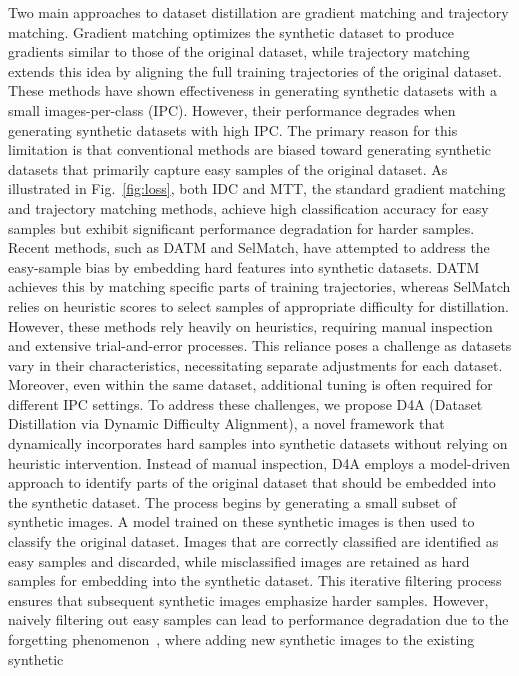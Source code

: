 \documentclass{article}
\theoremstyle{plain}
\theoremstyle{definition}
\theoremstyle{remark}
\begin{document}
Two main approaches to dataset distillation are gradient matching and trajectory matching. Gradient
matching optimizes the synthetic dataset to produce gradients similar to those of the original dataset,
while trajectory matching extends this idea by aligning the full training trajectories of the original dataset.
These methods have shown effectiveness in generating synthetic datasets with a small images-per-class (IPC).
However, their performance degrades when generating synthetic datasets with high IPC.
The primary reason for this limitation is that conventional methods are biased toward
generating synthetic datasets that primarily capture easy samples of the original dataset.
As illustrated in Fig.~\ref{fig:loss}, both IDC and MTT, the standard gradient matching and
trajectory matching methods, achieve high classification accuracy for easy samples but
exhibit significant performance degradation for harder samples.
Recent methods, such as DATM and SelMatch, have attempted to address the easy-sample bias by
embedding hard features into synthetic datasets. DATM achieves this by matching specific parts
of training trajectories, whereas SelMatch relies on heuristic scores to select
samples of appropriate difficulty for distillation.
However, these methods rely heavily on heuristics, requiring manual inspection and extensive
trial-and-error processes. This reliance poses a challenge as datasets vary in their
characteristics, necessitating separate adjustments for each dataset. Moreover, even within
the same dataset, additional tuning is often required for different IPC settings.
To address these challenges, we propose D4A (Dataset Distillation via Dynamic Difficulty Alignment),
a novel framework that dynamically incorporates hard samples into synthetic datasets without
relying on heuristic intervention. Instead of manual inspection, D4A employs
a model-driven approach to identify parts of the original dataset that should be embedded
into the synthetic dataset.
The process begins by generating a small subset of synthetic images.
A model trained on these synthetic images is then used to classify the original dataset.
Images that are correctly classified are identified as easy samples and discarded,
while misclassified images are retained as hard samples for embedding into the synthetic dataset.
This iterative filtering process ensures that subsequent synthetic images emphasize harder samples.
However, naively filtering out easy samples can lead to performance degradation due
to the forgetting phenomenon~\cite{}, where adding new synthetic images to the existing synthetic
\end{document}
